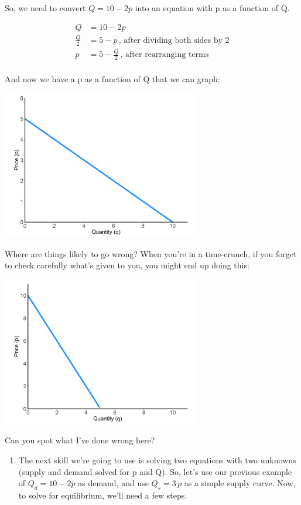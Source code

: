 \documentclass[11pt,]{article}
\providecommand{\tightlist}{%
  \setlength{\itemsep}{0pt}\setlength{\parskip}{0pt}}
\begin{document}
So, we need to convert \(Q=10-2p\) into an equation with p as a function
of Q.

\begin{align*}
  Q&=10-2p\\
  \frac{Q}{2}&=5-p\,\text{, after dividing both sides by 2}\\
  p&=5-\frac{Q}{2}\,\text{, after rearranging terms}\\
\end{align*}

And now we have a p as a function of Q that we can graph:

\begin{center}
\includegraphics[width=0.65\textwidth]{../images/eq_1.png}
\end{center}

Where are things likely to go wrong? When you're in a time-crunch, if
you forget to check carefully what's given to you, you might end up
doing this:

\begin{center}
\includegraphics[width=0.65\textwidth]{../images/eq_wrong.png}
\end{center}

Can you spot what I've done wrong here?

\begin{enumerate}
\def\labelenumi{\arabic{enumi}.}
\setcounter{enumi}{1}
\tightlist
\item
  The next skill we're going to use is solving two equations with two
  unknowns (supply and demand solved for p and Q). So, let's use our
  previous example of \(Q_d=10-2p\) as demand, and use \(Q_s=3\,p\) as a
  simple supply curve. Now, to solve for equilibrium, we'll need a few
  steps.
\end{enumerate}
\end{document}
